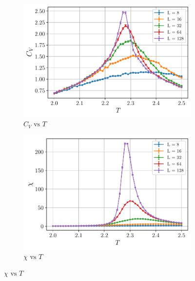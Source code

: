 \documentclass[../thesis_main.tex]{subfiles}
\begin{document}
\begin{figure}[!htb]\ContinuedFloat
    \centering
    \begin{subfigure}[b]{0.49\textwidth}
        \centering
        \includegraphics[width=\textwidth]{images/monte_carlo/wolff_cluster/C_v.pdf}
        \caption{$C_V \text{ vs } T$}
        \label{specificheat}
    \end{subfigure}
    \begin{subfigure}[b]{0.49\textwidth}
        \centering
        \includegraphics[width=\textwidth]{images/monte_carlo/wolff_cluster/chi.pdf}
        \caption{$\chi \text{ vs } T$}
        \label{susceptibility}
    \end{subfigure}
\end{figure}
\end{document}
